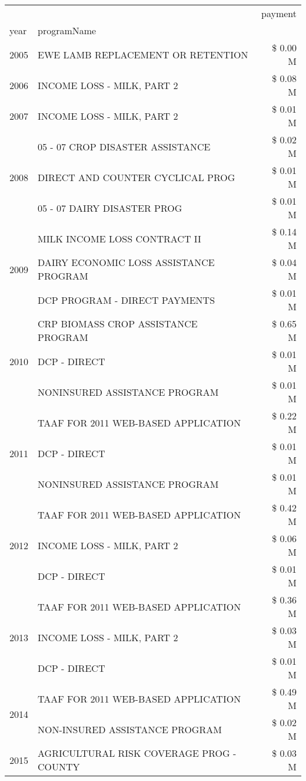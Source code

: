 \begin{tabular}{llr}
\toprule
 &  & payment \\
year & programName &  \\
\midrule
2005 & EWE LAMB REPLACEMENT OR RETENTION & \$ 0.00 M \\
\cline{1-3}
2006 & INCOME LOSS - MILK, PART 2 & \$ 0.08 M \\
\cline{1-3}
2007 & INCOME LOSS - MILK, PART 2 & \$ 0.01 M \\
\cline{1-3}
\multirow[t]{3}{*}{2008} & 05 - 07 CROP DISASTER ASSISTANCE & \$ 0.02 M \\
 & DIRECT AND COUNTER CYCLICAL PROG & \$ 0.01 M \\
 & 05 - 07 DAIRY DISASTER PROG & \$ 0.01 M \\
\cline{1-3}
\multirow[t]{3}{*}{2009} & MILK INCOME LOSS CONTRACT II & \$ 0.14 M \\
 & DAIRY ECONOMIC LOSS ASSISTANCE PROGRAM & \$ 0.04 M \\
 & DCP PROGRAM - DIRECT PAYMENTS & \$ 0.01 M \\
\cline{1-3}
\multirow[t]{3}{*}{2010} & CRP BIOMASS CROP ASSISTANCE PROGRAM & \$ 0.65 M \\
 & DCP - DIRECT & \$ 0.01 M \\
 & NONINSURED ASSISTANCE PROGRAM & \$ 0.01 M \\
\cline{1-3}
\multirow[t]{3}{*}{2011} & TAAF FOR 2011 WEB-BASED APPLICATION & \$ 0.22 M \\
 & DCP - DIRECT & \$ 0.01 M \\
 & NONINSURED ASSISTANCE PROGRAM & \$ 0.01 M \\
\cline{1-3}
\multirow[t]{3}{*}{2012} & TAAF FOR 2011 WEB-BASED APPLICATION & \$ 0.42 M \\
 & INCOME LOSS - MILK, PART 2 & \$ 0.06 M \\
 & DCP - DIRECT & \$ 0.01 M \\
\cline{1-3}
\multirow[t]{3}{*}{2013} & TAAF FOR 2011 WEB-BASED APPLICATION & \$ 0.36 M \\
 & INCOME LOSS - MILK, PART 2 & \$ 0.03 M \\
 & DCP - DIRECT & \$ 0.01 M \\
\cline{1-3}
\multirow[t]{2}{*}{2014} & TAAF FOR 2011 WEB-BASED APPLICATION & \$ 0.49 M \\
 & NON-INSURED ASSISTANCE PROGRAM & \$ 0.02 M \\
\cline{1-3}
\multirow[t]{3}{*}{2015} & AGRICULTURAL RISK COVERAGE PROG - COUNTY & \$ 0.03 M \\

\end{tabular}
